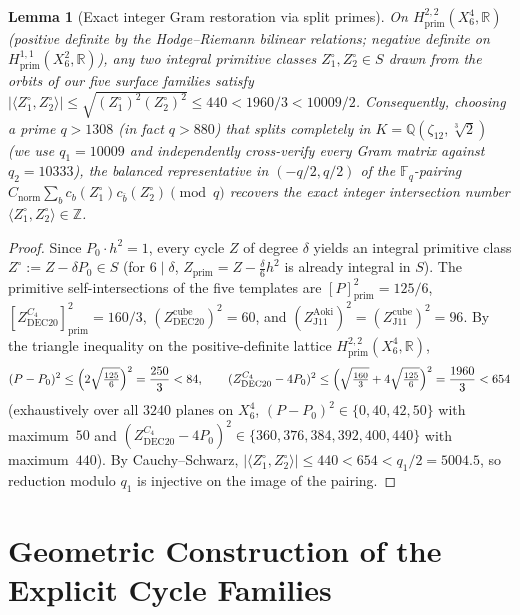 \documentclass[11pt,a4paper]{amsart}
\newtheorem{lemma}[theorem]{Lemma}
\theoremstyle{definition}
\newcommand{\ZZ}{\mathbb{Z}}
\newcommand{\QQ}{\mathbb{Q}}
\newcommand{\RR}{\mathbb{R}}
\newcommand{\FF}{\mathbb{F}}
\newcommand{\prim}{\mathrm{prim}}
\begin{document}
\begin{lemma}[Exact integer Gram restoration via split primes]\label{lem:split-prime}
On $H^{2,2}_\prim(X_6^4, \RR)$ (positive definite by the Hodge--Riemann bilinear relations; negative definite on $H^{1,1}_\prim(X_6^2, \RR)$), any two integral primitive classes $Z_1^\circ, Z_2^\circ \in S$ drawn from the orbits of our five surface families satisfy $|\langle Z_1^\circ, Z_2^\circ \rangle| \le \sqrt{(Z_1^\circ)^2 (Z_2^\circ)^2} \le 440 < 1960/3 < 10009/2$.
Consequently, choosing a prime $q > 1308$ (in fact $q > 880$) that splits completely in $K = \QQ(\zeta_{12}, \sqrt[3]{2})$ (we use $q_1 = 10009$ and independently cross-verify every Gram matrix against $q_2 = 10333$), the balanced representative in $(-q/2, q/2)$ of the $\FF_q$-pairing $C_{\mathrm{norm}} \sum_b c_b(Z_1^\circ) c_{\bar{b}}(Z_2^\circ) \pmod q$ recovers the \emph{exact} integer intersection number $\langle Z_1^\circ, Z_2^\circ \rangle \in \ZZ$.
\end{lemma}
\begin{proof}
Since $P_0 \cdot h^2 = 1$, every cycle $Z$ of degree $\delta$ yields an integral primitive class $Z^{\circ} := Z - \delta P_0 \in S$ (for $6 \mid \delta$, $Z_\prim = Z - \frac{\delta}{6} h^2$ is already integral in $S$). The primitive self-intersections of the five templates are $[P]_\prim^2 = 125/6$, $[Z_{\mathrm{DEC20}}^{C_4}]_\prim^2 = 160/3$, $(Z_{\mathrm{DEC20}}^{\mathrm{cube}})^2 = 60$, and $(Z_{\mathrm{J11}}^{\mathrm{Aoki}})^2 = (Z_{\mathrm{J11}}^{\mathrm{cube}})^2 = 96$. By the triangle inequality on the positive-definite lattice $H^{2,2}_\prim(X_6^4, \RR)$,
\[
  (P - P_0)^2 \le \Bigl(2\sqrt{\tfrac{125}{6}}\Bigr)^2 = \frac{250}{3} < 84, \qquad
  (Z_{\mathrm{DEC20}}^{C_4} - 4 P_0)^2 \le \Bigl(\sqrt{\tfrac{160}{3}} + 4\sqrt{\tfrac{125}{6}}\Bigr)^2 = \frac{1960}{3} < 654
\]
(exhaustively over all $3240$ planes on $X_6^4$, $(P - P_0)^2 \in \{0, 40, 42, 50\}$ with maximum~$50$ and $(Z_{\mathrm{DEC20}}^{C_4} - 4 P_0)^2 \in \{360, 376, 384, 392, 400, 440\}$ with maximum~$440$). By Cauchy--Schwarz, $|\langle Z_1^\circ, Z_2^\circ \rangle| \le 440 < 654 < q_1/2 = 5004.5$, so reduction modulo $q_1$ is injective on the image of the pairing.
\end{proof}

\section{Geometric Construction of the Explicit Cycle Families}
\end{document}
